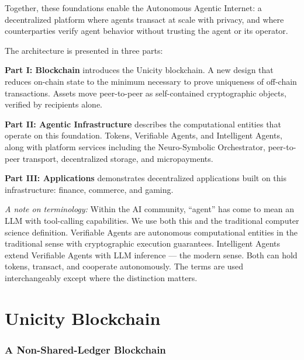 \documentclass{article}
\begin{document}
\medskip

Together, these foundations enable the Autonomous Agentic Internet: a decentralized platform where agents transact at scale with privacy, and where counterparties verify agent behavior without trusting the agent or its operator.

\medskip

The architecture is presented in three parts:

\medskip

\textbf{Part I: Blockchain} introduces the Unicity blockchain. A new design that reduces on-chain state to the minimum necessary to prove uniqueness of off-chain transactions. Assets move peer-to-peer as self-contained cryptographic objects, verified by recipients alone.

\medskip

\textbf{Part II: Agentic Infrastructure} describes the computational entities that operate on this foundation. Tokens, Verifiable Agents, and Intelligent Agents, along with platform services including the Neuro-Symbolic Orchestrator, peer-to-peer transport, decentralized storage, and micropayments.

\medskip

\textbf{Part III: Applications} demonstrates decentralized applications built on this infrastructure: finance, commerce, and gaming.

\medskip

\noindent\textit{A note on terminology:} Within the AI community, ``agent'' has come to mean an LLM with tool-calling capabilities. We use both this and the traditional computer science definition. Verifiable Agents are autonomous computational entities in the traditional sense with cryptographic execution guarantees. Intelligent Agents extend Verifiable Agents with LLM inference --- the modern sense. Both can hold tokens, transact, and cooperate autonomously. The terms are used interchangeably except where the distinction matters.

\newpage

\part{Unicity Blockchain}

\section{A Non-Shared-Ledger Blockchain}
\end{document}
